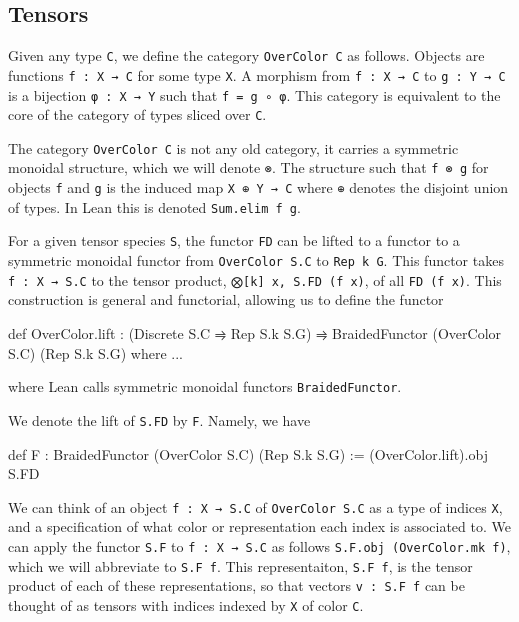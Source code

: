 \documentclass[a4paper, 11pt]{article}
\begin{document}
\subsection{Tensors} 

Given any type \lstinline|C|, we define the category \lstinline|OverColor C| as follows. 
Objects are functions \lstinline|f : X → C| for some type \lstinline|X|. A morphism from
\lstinline|f : X → C| to \lstinline|g : Y → C| is a bijection
\lstinline|φ : X → Y| such that \lstinline|f = g ∘ φ|. This category is equivalent to the core of the
category of types sliced over \lstinline|C|. 

The category \lstinline|OverColor C| is not any old category, it carries a symmetric monoidal structure,
which we will denote \lstinline|⊗|. The structure such that \lstinline|f ⊗ g| for objects \lstinline|f| and \lstinline|g|
is the induced map \lstinline|X ⊕ Y → C| where \lstinline|⊕| denotes the disjoint union of types.
In Lean this is denoted \lstinline|Sum.elim f g|. 

For a given tensor species \lstinline|S|, the functor \lstinline|FD| can be lifted to a functor
to a symmetric monoidal functor from \lstinline|OverColor S.C| to \lstinline|Rep k G|.
This functor takes \lstinline|f : X → S.C| to the tensor product,
\lstinline|⨂[k] x, S.FD (f x)|, of all \lstinline|FD (f x)|. 
This construction is general and functorial, allowing us to define the functor 
\begin{code}
def OverColor.lift : (Discrete S.C ⥤ Rep S.k S.G) ⥤ BraidedFunctor (OverColor S.C) (Rep S.k S.G) where ...
\end{code}
where Lean calls symmetric monoidal functors \lstinline|BraidedFunctor|.

We denote the lift of \lstinline|S.FD| by \lstinline|F|. Namely, we have
\begin{code}
def F : BraidedFunctor (OverColor S.C) (Rep S.k S.G) := (OverColor.lift).obj S.FD
\end{code}

We can think of an object \lstinline|f : X → S.C| of \lstinline|OverColor S.C| as a type of indices \lstinline|X|,
and a specification of what color or representation each index is associated to. 
We can apply the functor \lstinline|S.F| to \lstinline|f : X → S.C| as follows 
\lstinline|S.F.obj (OverColor.mk f)|, which we will abbreviate to \lstinline|S.F f|.
This representaiton, \lstinline|S.F f|, is the tensor product of each of these representations, so that vectors
\lstinline|v : S.F f| can be thought of as tensors with indices indexed by \lstinline|X| of color \lstinline|C|. 
\end{document}
